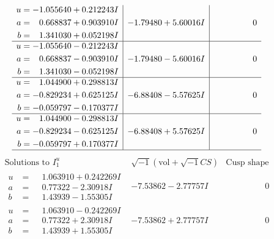 \documentclass[1p]{elsarticle_modified}
\theoremstyle{definition}
\newcommand{\I}{\sqrt{-1}}
\begin{document}
$$\begin{array}{c|c|c}
\begin{aligned}
u &= -1.055640 + 0.212243 I \\
a &= \phantom{-}0.668837 + 0.903910 I \\
b &= \phantom{-}1.341030 + 0.052198 I\end{aligned}
 & -1.79480 + 5.60016 I & \phantom{-0.000000 } 0 \\ \hline\begin{aligned}
u &= -1.055640 - 0.212243 I \\
a &= \phantom{-}0.668837 - 0.903910 I \\
b &= \phantom{-}1.341030 - 0.052198 I\end{aligned}
 & -1.79480 - 5.60016 I & \phantom{-0.000000 } 0 \\ \hline\begin{aligned}
u &= \phantom{-}1.044900 + 0.298813 I \\
a &= -0.829234 + 0.625125 I \\
b &= -0.059797 - 0.170377 I\end{aligned}
 & -6.88408 - 5.57625 I & \phantom{-0.000000 } 0 \\ \hline\begin{aligned}
u &= \phantom{-}1.044900 - 0.298813 I \\
a &= -0.829234 - 0.625125 I \\
b &= -0.059797 + 0.170377 I\end{aligned}
 & -6.88408 + 5.57625 I & \phantom{-0.000000 } 0\\
 \hline 
 \end{array}$$\newpage$$\begin{array}{c|c|c}  
\text{Solutions to }I^u_{1}& \I (\text{vol} + \sqrt{-1}CS) & \text{Cusp shape}\\
 \hline 
\begin{aligned}
u &= \phantom{-}1.063910 + 0.242269 I \\
a &= \phantom{-}0.77322 - 2.30918 I \\
b &= \phantom{-}1.43939 - 1.55305 I\end{aligned}
 & -7.53862 - 2.77757 I & \phantom{-0.000000 } 0 \\ \hline\begin{aligned}
u &= \phantom{-}1.063910 - 0.242269 I \\
a &= \phantom{-}0.77322 + 2.30918 I \\
b &= \phantom{-}1.43939 + 1.55305 I\end{aligned}
 & -7.53862 + 2.77757 I & \phantom{-0.000000 } 0 \\ \hline\begin{aligned}

\end{aligned}
\end{array}$$
\end{document}
